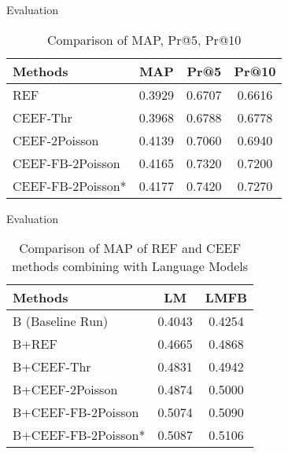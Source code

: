 \documentclass{beamer}
\begin{document}
%

\begin{frame}{Evaluation}
	\begin{table}
		\centering
		\begin{tabular}{lS[tabnumalign=centre,tabformat=1.4,decimalsymbol=comma]S[tabnumalign=centre,tabformat=1.4,decimalsymbol=comma]S[tabnumalign=centre,tabformat=1.4,decimalsymbol=comma]}
			\toprule
			Methods & {MAP} & {Pr@5} & {Pr@10}\\
			\midrule
			REF & 0.3929 & 0.6707 & 0.6616\\
			CEEF-Thr & 0.3968 & 0.6788 & 0.6778\\
			CEEF-2Poisson & 0.4139 & 0.7060 & 0.6940\\
			CEEF-FB-2Poisson & 0.4165 & 0.7320 & 0.7200\\
			CEEF-FB-2Poisson* & 0.4177 & 0.7420 & 0.7270\\
			\bottomrule
		\end{tabular}
		\caption{Comparison of MAP, Pr@5, Pr@10}
		\cite{paper:NaNg}
	\end{table}


\end{frame}

\begin{frame}{Evaluation}
	\begin{table}
		\centering
		\begin{tabular}{lS[tabnumalign=centre,tabformat=1.4,decimalsymbol=comma]S[tabnumalign=centre,tabformat=1.4,decimalsymbol=comma]}
			\toprule
			Methods & {LM} & {LMFB} \\
			\midrule
			B (Baseline Run) & 0.4043 & 0.4254 \\
			B+REF & 0.4665 & 0.4868 \\
			B+CEEF-Thr & 0.4831 & 0.4942 \\
			B+CEEF-2Poisson & 0.4874 & 0.5000 \\
			B+CEEF-FB-2Poisson & 0.5074 & 0.5090 \\
			B+CEEF-FB-2Poisson* & 0.5087 & 0.5106 \\
			\bottomrule
		\end{tabular}
		\caption{Comparison of MAP of REF and CEEF methods combining with Language Models}
		\cite{paper:NaNg}
	\end{table}
\end{frame}
\end{document}
